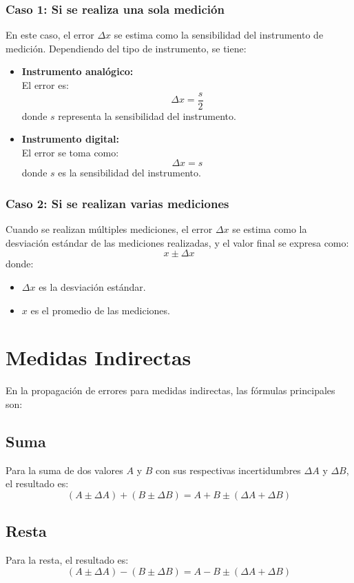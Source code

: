 \subsubsection{Caso 1: Si se realiza una sola medición}
En este caso, el error $\Delta x$ se estima como la sensibilidad del instrumento de medición. Dependiendo del tipo de instrumento, se tiene:

\begin{itemize}
    \item \textbf{Instrumento analógico:} \\
    El error es:
    \[
    \Delta x = \frac{s}{2}
    \]
    donde $s$ representa la sensibilidad del instrumento.
    
    \item \textbf{Instrumento digital:} \\
    El error se toma como:
    \[
    \Delta x = s
    \]
    donde $s$ es la sensibilidad del instrumento.
\end{itemize}

\subsubsection{Caso 2: Si se realizan varias mediciones}
Cuando se realizan múltiples mediciones, el error $\Delta x$ se estima como la desviación estándar de las mediciones realizadas, y el valor final se expresa como:
\[
x \pm \Delta x
\]
donde:
\begin{itemize}
    \item $\Delta x$ es la desviación estándar.
    \item $x$ es el promedio de las mediciones.
\end{itemize}

\newpage
\section{Medidas Indirectas}
En la propagación de errores para medidas indirectas, las fórmulas principales son:

\subsection{Suma}
Para la suma de dos valores $A$ y $B$ con sus respectivas incertidumbres $\Delta A$ y $\Delta B$, el resultado es:
\[
(A \pm \Delta A) + (B \pm \Delta B) = A + B \pm (\Delta A + \Delta B)
\]

\subsection{Resta}
Para la resta, el resultado es:
\[
(A \pm \Delta A) - (B \pm \Delta B) = A - B \pm (\Delta A + \Delta B)
\]

